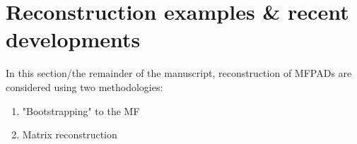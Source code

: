 \section{Reconstruction examples & recent developments}

In this section/the remainder of the manuscript, reconstruction of MFPADs are considered using two methodologies:

\begin{enumerate}
\item "Bootstrapping" to the MF
\item Matrix reconstruction
\end{enumerate}